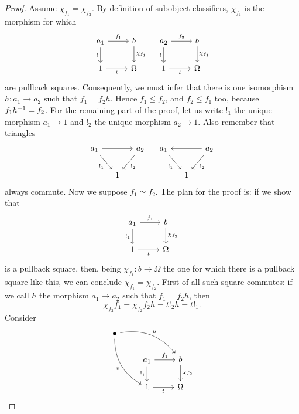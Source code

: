 \begin{proof}
Assume \(\chi_{f_1} = \chi_{f_2}\). By definition of subobject classifiers, \(\chi_{f_1}\) is the morphism for which
\[\begin{tikzcd}
a_1 \ar["{!}", d, swap] \ar["{f_1}", r] & b \ar["{\chi_{f_1}}", d] \\
1 \ar["t", r, swap] & \Omega
\end{tikzcd} \quad \begin{tikzcd}
a_2 \ar["{!}", d, swap] \ar["{f_2}", r] & b \ar["{\chi_{f_1}}", d] \\
1 \ar["t", r, swap] & \Omega
\end{tikzcd}\]
are pullback squares. Consequently, we must infer that there is one isomorphism \(h : a_1 \to a_2\) such that \(f_1 = f_2 h\). Hence \(f_1 \le f_2\), and \(f_2 \le f_1\) too, because \(f_1 h^{-1} = f_2\).\newline
For the remaining part of the proof, let us write \(!_1\) the unique morphism \(a_1 \to 1\) and \(!_2\) the unique morphism \(a_2 \to 1\). Also remember that triangles
\[\begin{tikzcd}[column sep=small]
a_1 \ar["{!_1}", dr, swap] \ar[rr] & & a_2 \ar["{!_2}", dl] \\
& 1
\end{tikzcd} \quad \begin{tikzcd}[column sep=small]
a_1 \ar["{!_1}", dr, swap] & & a_2 \ar["{!_2}", dl] \ar[ll] \\
& 1
\end{tikzcd}\]
always commute.\newline
Now we suppose \(f_1 \simeq f_2\). The plan for the proof is: if we show that
\[\begin{tikzcd}
a_1 \ar["{!_1}", d, swap] \ar["{f_1}", r] & b \ar["{\chi_{f_2}}", d] \\
1 \ar["t", r, swap] & \Omega
\end{tikzcd}\]
is a pullback square, then, being \(\chi_{f_1} : b \to \Omega\) the one for which there is a pullback square like this, we can conclude \(\chi_{f_1} = \chi_{f_2}\). First of all such square commutes: if we call \(h\) the morphism \(a_1 \to a_2\) such that \(f_1 = f_2 h\), then
\[\chi_{f_2} f_1 = \chi_{f_2} f_2 h = t !_2 h = t !_1 .\]
Consider
\[\begin{tikzcd}
\bullet \ar["u", drr, bend left] \ar["v", ddr, swap, bend right] \\
& a_1 \ar["{!_1}", d, swap] \ar["{f_1}", r] & b \ar["{\chi_{f_2}}", d] \\
& 1 \ar["t", r, swap] & \Omega

\end{tikzcd}\]
\end{proof}
